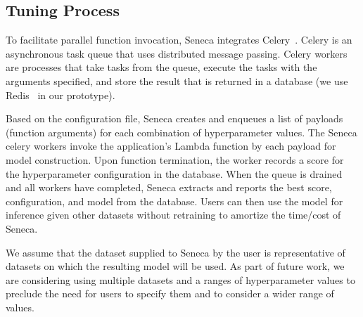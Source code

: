 \subsection{Tuning Process}

To facilitate parallel function invocation, Seneca integrates 
Celery~\cite{ref:celery}.
Celery is an asynchronous task queue 
that uses distributed message passing. Celery workers are processes 
that take tasks from the queue, execute the tasks with the arguments specified, 
and store the result that is returned 
in a database (we use Redis~\cite{ref:redis}
in our prototype). 

Based on the configuration file, Seneca creates and enqueues a list of
payloads (function arguments) for each combination of hyperparameter
values.  The Seneca celery workers invoke the application's Lambda
function by each payload for model construction. Upon function
termination, the worker records a score for the hyperparameter
configuration in the database.  When the queue is drained and all
workers have completed, Seneca extracts and reports the best score,
configuration, and model from the database. Users can then use the
model for inference given other datasets without retraining to
amortize the time/cost of Seneca.


We assume that the dataset supplied to Seneca by the user is representative of 
datasets on which the 
resulting model will be used.  
As part of future work, we are considering using multiple datasets and a ranges
of hyperparameter values to preclude the need for users to specify
them and to consider a wider range of values.
